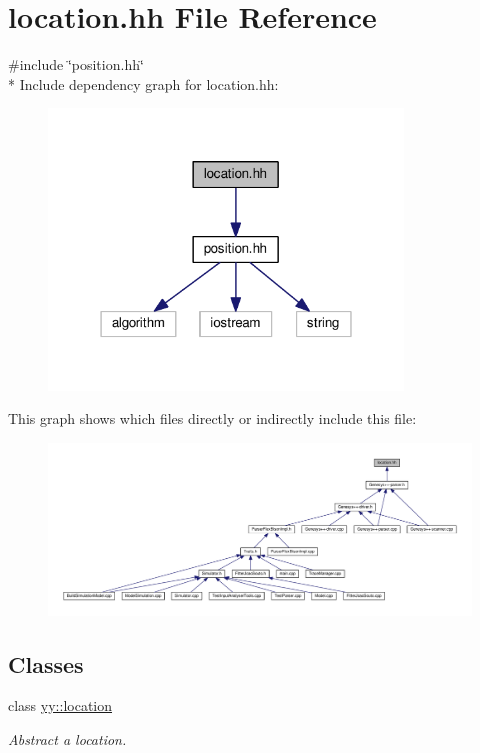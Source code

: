 \hypertarget{location_8hh}{\section{location.\-hh File Reference}
\label{location_8hh}
}
{\ttfamily \#include \char`\"{}position.\-hh\char`\"{}}\\*
Include dependency graph for location.\-hh\-:
\nopagebreak
\begin{figure}[H]
\begin{center}
\leavevmode
\includegraphics[width=267pt]{location_8hh__incl}
\end{center}
\end{figure}
This graph shows which files directly or indirectly include this file\-:
\nopagebreak
\begin{figure}[H]
\begin{center}
\leavevmode
\includegraphics[width=350pt]{location_8hh__dep__incl}
\end{center}
\end{figure}
\subsection*{Classes}
\begin{DoxyCompactItemize}
\item 
class \hyperlink{classyy_1_1location}{yy\-::location}
\begin{DoxyCompactList}\small\item\em Abstract a location. \end{DoxyCompactList}\end{DoxyCompactItemize}
